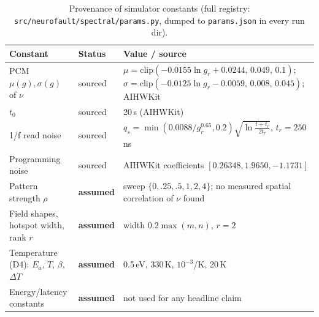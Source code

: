 \documentclass[journal]{IEEEtran}
\begin{document}
\begin{table}[t]
\caption{Provenance of simulator constants (full registry: \texttt{src/neurofault/spectral/params.py}, dumped to \texttt{params.json} in every run dir).}
\label{tab:params}
\centering\footnotesize
\begin{tabular}{p{2.5cm}p{1.9cm}p{3.0cm}}
\toprule
Constant & Status & Value / source \\
\midrule
PCM $\mu(g),\sigma(g)$ of $\nu$ & sourced & $\mu=\mathrm{clip}(-0.0155\ln g_r+0.0244,\,0.049,\,0.1)$; $\sigma=\mathrm{clip}(-0.0125\ln g_r-0.0059,\,0.008,\,0.045)$; AIHWKit \\
$t_0$ & sourced & 20\,s (AIHWKit) \\
1/f read noise & sourced & $q_s=\min(0.0088/g_r^{0.65},0.2)\sqrt{\ln\frac{t+t_r}{2t_r}}$, $t_r=250$\,ns \\
Programming noise & sourced & AIHWKit coefficients $[0.26348,1.9650,-1.1731]$ \\
Pattern strength $\rho$ & \textbf{assumed} & sweep $\{0,.25,.5,1,2,4\}$; no measured spatial correlation of $\nu$ found \\
Field shapes, hotspot width, rank $r$ & \textbf{assumed} & width 0.2$\max(m,n)$, $r=2$ \\
Temperature (D4): $E_a$, $T$, $\beta$, $\Delta T$ & \textbf{assumed} & 0.5\,eV, 330\,K, $10^{-3}$/K, 20\,K \\
Energy/latency constants & \textbf{assumed} & not used for any headline claim \\
\bottomrule
\end{tabular}
\end{table}
\end{document}
